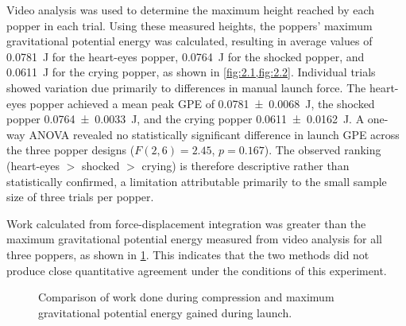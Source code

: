 \documentclass[reprint,amsmath,amssymb,aps,twoside]{revtex4-2} %
\begin{document}


Video analysis was used to determine the maximum height reached by each popper in each trial. Using these measured heights, the poppers' maximum gravitational potential energy was calculated, resulting in average values of \qty{0.0781}{\joule} for the heart-eyes popper, \qty{0.0764}{\joule} for the shocked popper, and \qty{0.0611}{\joule} for the crying popper, as shown in \cref{fig:2.1,fig:2.2}. Individual trials showed variation due primarily to differences in manual launch force. The heart-eyes popper achieved a mean peak GPE of \qty{0.0781\pm0.0068}{\joule}, the shocked popper \qty{0.0764\pm0.0033}{\joule}, and the crying popper \qty{0.0611\pm0.0162}{\joule}. A one-way ANOVA revealed no statistically significant difference in launch GPE across the three popper designs ($F(2, 6) = 2.45$, $p = 0.167$). The observed ranking (heart-eyes $>$ shocked $>$ crying) is therefore descriptive rather than statistically confirmed, a limitation attributable primarily to the small sample size of three trials per popper.

Work calculated from force-displacement integration was greater than the maximum gravitational potential energy measured from video analysis for all three poppers, as shown in \cref{fig:3}. This indicates that the two methods did not produce close quantitative agreement under the conditions of this experiment.
\begin{figure}
\begin{center}

\end{center}
\caption{Comparison of work done during compression and maximum gravitational potential energy gained during launch.}
\label{fig:3}
\end{figure}
\end{document}
